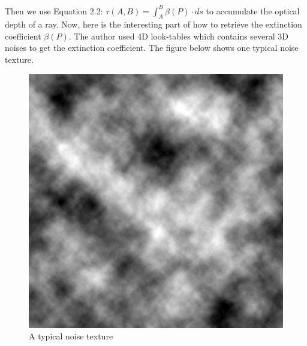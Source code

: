 Then we use Equation 2.2: $\tau(A, B) = \int_{A}^{B}\beta(P)\cdot ds$ to accumulate the optical depth of a ray. Now, here is the interesting part of how to retrieve the extinction coefficient $\beta(P)$. The author used 4D look-tables which contains several 3D noises to get the extinction coefficient. The figure below shows one typical noise texture.

\begin{figure}[htp]
\begin{center}
\includegraphics[scale=0.15]{images/Noise.png}
\caption{A typical noise texture}
\label{f10}
\end{center}
\end{figure}


